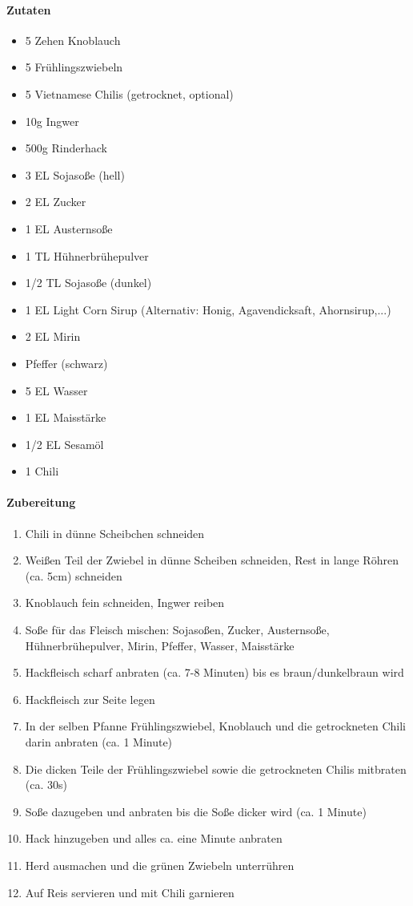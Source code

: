 \newpage
{}
\paragraph{Zutaten}
\begin{itemize}[noitemsep]
	\item 5 Zehen Knoblauch
	\item 5 Frühlingszwiebeln
	\item 5 Vietnamese Chilis (getrocknet, optional)
	\item 10g Ingwer
	\item 500g Rinderhack
	\item 3 EL Sojasoße (hell)
	\item 2 EL Zucker
	\item 1 EL Austernsoße
	\item 1 TL Hühnerbrühepulver
	\item 1/2 TL Sojasoße (dunkel)
	\item 1 EL Light Corn Sirup (Alternativ: Honig, Agavendicksaft, Ahornsirup,...)
	\item 2 EL Mirin
	\item Pfeffer (schwarz)
	\item 5 EL Wasser
	\item 1 EL Maisstärke
	\item 1/2 EL Sesamöl
	\item 1 Chili
\end{itemize}

\paragraph{Zubereitung}
\begin{enumerate}[noitemsep]
	\item Chili in dünne Scheibchen schneiden
	\item Weißen Teil der Zwiebel in dünne Scheiben schneiden, Rest in lange Röhren (ca. 5cm) schneiden
	\item Knoblauch fein schneiden, Ingwer reiben
	\item Soße für das Fleisch mischen: Sojasoßen, Zucker, Austernsoße, Hühnerbrühepulver, Mirin, Pfeffer, Wasser, Maisstärke
	\item Hackfleisch scharf anbraten (ca. 7-8 Minuten) bis es braun/dunkelbraun wird
	\item Hackfleisch zur Seite legen
	\item In der selben Pfanne Frühlingszwiebel, Knoblauch und die getrockneten Chili darin anbraten (ca. 1 Minute)
	\item Die dicken Teile der Frühlingszwiebel sowie die getrockneten Chilis mitbraten (ca. 30s)
	\item Soße dazugeben und anbraten bis die Soße dicker wird (ca. 1 Minute)
	\item Hack hinzugeben und alles ca. eine Minute anbraten
	\item Herd ausmachen und die grünen Zwiebeln unterrühren
	\item Auf Reis servieren und mit Chili garnieren
\end{enumerate}
